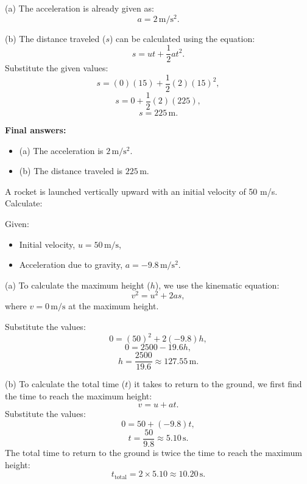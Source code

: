 \documentclass[addpoints]{exam}
\begin{document}
\begin{questions}
\begin{solution}[5cm]
(a) The acceleration is already given as:
\[a = 2 \, \mathrm{m/s^2}.\]

(b) The distance traveled (\(s\)) can be calculated using the equation:
\[s = ut + \frac{1}{2}at^2.\]
Substitute the given values:
\[s = (0)(15) + \frac{1}{2}(2)(15)^2,\]
\[s = 0 + \frac{1}{2}(2)(225),\]
\[s = 225 \, \mathrm{m}.\]

\textbf{Final answers:}
\begin{itemize}
    \item (a) The acceleration is \(2 \, \mathrm{m/s^2}\).
    \item (b) The distance traveled is \(225 \, \mathrm{m}\).
\end{itemize}
\end{solution}



\question A rocket is launched vertically upward with an initial velocity of 50 m/s. Calculate:
\begin{solution}[5cm]
    Given:
\begin{itemize}
    \item Initial velocity, \(u = 50 \, \mathrm{m/s}\),
    \item Acceleration due to gravity, \(a = -9.8 \, \mathrm{m/s^2}\).
\end{itemize}

(a) To calculate the maximum height (\(h\)), we use the kinematic equation:
\[v^2 = u^2 + 2as,\]
where \(v = 0 \, \mathrm{m/s}\) at the maximum height.

Substitute the values:
\[0 = (50)^2 + 2(-9.8)h,\]
\[0 = 2500 - 19.6h,\]
\[h = \frac{2500}{19.6} \approx 127.55 \, \mathrm{m}.\]

(b) To calculate the total time (\(t\)) it takes to return to the ground, we first find the time to reach the maximum height:
\[v = u + at.\]
Substitute the values:
\[0 = 50 + (-9.8)t,\]
\[t = \frac{50}{9.8} \approx 5.10 \, \mathrm{s}.\]
The total time to return to the ground is twice the time to reach the maximum height:
\[t_{\text{total}} = 2 \times 5.10 \approx 10.20 \, \mathrm{s}.\]


\end{solution}
\end{questions}
\end{document}
